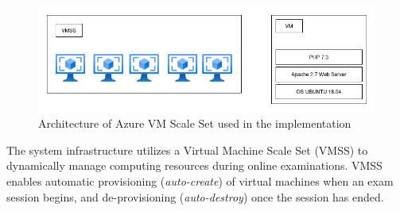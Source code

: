 \begin{figure}[H]
    \centering
    \includegraphics[width=14cm]{figure/vmss.drawio.png}
    \caption{Architecture of Azure VM Scale Set used in the implementation}
    \label{fig:vmss-architecture}
\end{figure}

The system infrastructure utilizes a Virtual Machine Scale Set (VMSS) to dynamically manage computing resources during online examinations. VMSS enables automatic provisioning (\textit{auto-create}) of virtual machines when an exam session begins, and de-provisioning (\textit{auto-destroy}) once the session has ended. 




